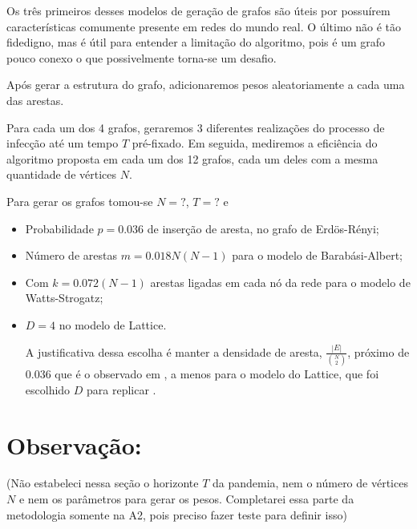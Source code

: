 \documentclass{article}
\begin{document}
Os três primeiros desses modelos de geração de grafos são úteis por possuírem características comumente presente em redes do mundo real. O último não é tão fidedigno, mas é útil para entender a limitação do algoritmo, pois é um grafo pouco conexo o que possivelmente torna-se um desafio.

Após gerar a estrutura do grafo, adicionaremos pesos aleatoriamente a cada uma das arestas.

Para cada um dos 4 grafos, geraremos 3 diferentes realizações do processo de infecção até um tempo $T$ pré-fixado. Em seguida, mediremos a eficiência do algoritmo proposta em cada um dos 12 grafos, cada um deles com a mesma quantidade de vértices $N$.

Para gerar os grafos tomou-se $N = ?$, $T=?$ e

\begin{itemize}
    \item Probabilidade $p = 0.036$ de inserção de aresta, no grafo de Erdös-Rényi;
    \item Número de arestas $m = 0.018N(N-1)$ para o modelo de Barabási-Albert;
    \item Com $k = 0.072(N-1)$ arestas ligadas em cada nó da rede para o modelo de Watts-Strogatz;
    \item $D = 4$ no modelo de Lattice.

A justificativa dessa escolha é manter a densidade de aresta, $\frac{|E|}{\binom{N}{2}}$, próximo de $0.036$ que é o observado em \cite{Main2}, a menos para o modelo do Lattice, que foi escolhido $D$ para replicar \cite{lattice}.
    
\end{itemize}

\section{Observação:}

(Não estabeleci nessa seção o horizonte $T$ da pandemia, nem o número de vértices $N$ e nem os parâmetros para gerar os pesos. Completarei essa parte da metodologia somente na A2, pois preciso fazer teste para definir isso)

\newpage

\nocite{*}


\end{document}
